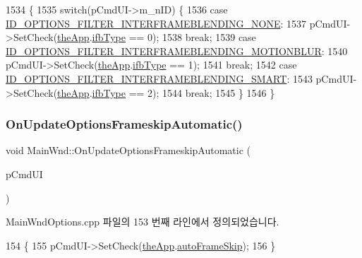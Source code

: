 \begin{DoxyCode}
1534 \{
1535   \textcolor{keywordflow}{switch}(pCmdUI->m\_nID) \{
1536   \textcolor{keywordflow}{case} \mbox{\hyperlink{resource_8h_afdae3676d339d2347ec856d6d41f757d}{ID\_OPTIONS\_FILTER\_INTERFRAMEBLENDING\_NONE}}:
1537     pCmdUI->SetCheck(\mbox{\hyperlink{_v_b_a_8cpp_a8095a9d06b37a7efe3723f3218ad8fb3}{theApp}}.\mbox{\hyperlink{class_v_b_a_a4349741c5cec8852f8914093484418e8}{ifbType}} == 0);
1538     \textcolor{keywordflow}{break};
1539   \textcolor{keywordflow}{case} \mbox{\hyperlink{resource_8h_a3bcde991b46036373d2561e792097b35}{ID\_OPTIONS\_FILTER\_INTERFRAMEBLENDING\_MOTIONBLUR}}:
1540     pCmdUI->SetCheck(\mbox{\hyperlink{_v_b_a_8cpp_a8095a9d06b37a7efe3723f3218ad8fb3}{theApp}}.\mbox{\hyperlink{class_v_b_a_a4349741c5cec8852f8914093484418e8}{ifbType}} == 1);
1541     \textcolor{keywordflow}{break};
1542   \textcolor{keywordflow}{case} \mbox{\hyperlink{resource_8h_a05cd7bc99a1031e7b74a561af9f8703c}{ID\_OPTIONS\_FILTER\_INTERFRAMEBLENDING\_SMART}}:
1543     pCmdUI->SetCheck(\mbox{\hyperlink{_v_b_a_8cpp_a8095a9d06b37a7efe3723f3218ad8fb3}{theApp}}.\mbox{\hyperlink{class_v_b_a_a4349741c5cec8852f8914093484418e8}{ifbType}} == 2);
1544     \textcolor{keywordflow}{break};
1545   \}
1546 \}
\end{DoxyCode}
\mbox{\label{class_main_wnd_ae5649490db983b067dbb0827ce64b14c}} 
\subsubsection{\texorpdfstring{On\+Update\+Options\+Frameskip\+Automatic()}{OnUpdateOptionsFrameskipAutomatic()}}
{\footnotesize\ttfamily void Main\+Wnd\+::\+On\+Update\+Options\+Frameskip\+Automatic (\begin{DoxyParamCaption}\item[{C\+Cmd\+UI $\ast$}]{p\+Cmd\+UI }\end{DoxyParamCaption})\hspace{0.3cm}{\ttfamily [protected]}}



Main\+Wnd\+Options.\+cpp 파일의 153 번째 라인에서 정의되었습니다.


\begin{DoxyCode}
154 \{
155   pCmdUI->SetCheck(\mbox{\hyperlink{_v_b_a_8cpp_a8095a9d06b37a7efe3723f3218ad8fb3}{theApp}}.\mbox{\hyperlink{class_v_b_a_a9ecbee7d82db73b24aee3afb66128388}{autoFrameSkip}});  
156 \}
\end{DoxyCode}
\mbox{\label{class_main_wnd_adb8330ee73130cb9c4dd676a9da387b9}} 
